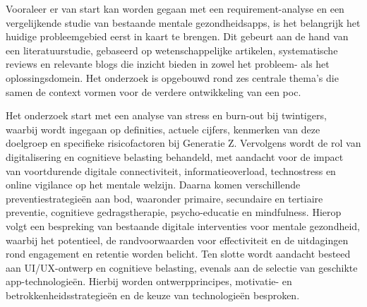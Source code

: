 %
%
%


Vooraleer er van start kan worden gegaan met een requirement-analyse en een vergelijkende studie van bestaande mentale gezondheidsapps, is het belangrijk het huidige probleemgebied eerst in kaart te brengen. Dit gebeurt aan de hand van een literatuurstudie, gebaseerd op wetenschappelijke artikelen, systematische reviews en relevante blogs die inzicht bieden in zowel het probleem- als het oplossingsdomein. Het onderzoek is opgebouwd rond zes centrale thema’s die samen de context vormen voor de verdere ontwikkeling van een \acrlong{poc}.

\vspace{1em}

Het onderzoek start met een analyse van stress en burn-out bij twintigers, waarbij wordt ingegaan op definities, actuele cijfers, kenmerken van deze doelgroep en specifieke risicofactoren bij Generatie Z. Vervolgens wordt de rol van digitalisering en cognitieve belasting behandeld, met aandacht voor de impact van voortdurende digitale connectiviteit, informatieoverload, technostress en online vigilance op het mentale welzijn. Daarna komen verschillende preventiestrategieën aan bod, waaronder primaire, secundaire en tertiaire preventie, cognitieve gedragstherapie, psycho-educatie en mindfulness. Hierop volgt een bespreking van bestaande digitale interventies voor mentale gezondheid, waarbij het potentieel, de randvoorwaarden voor effectiviteit en de uitdagingen rond engagement en retentie worden belicht. Ten slotte wordt aandacht besteed aan UI/UX-ontwerp en cognitieve belasting, evenals aan de selectie van geschikte app-technologieën. Hierbij worden ontwerpprincipes, motivatie- en betrokkenheidsstrategieën en de keuze van technologieën besproken.

